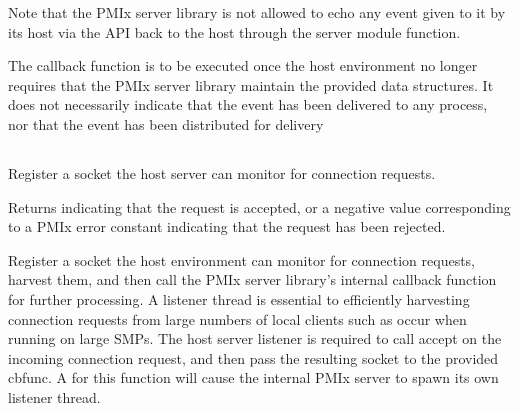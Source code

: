 Note that the \ac{PMIx} server library is not allowed to echo any event given to it by its host via the  \ac{API} back to the host through the  server module function.

\advicermstart
The callback function is to be executed once the host environment no longer requires that the \ac{PMIx} server library maintain the provided data structures. It does not necessarily indicate that the event has been delivered to any process, nor that the event has been distributed for delivery
\advicermend


\subsection{}

\summary

Register a socket the host server can monitor for connection requests.

\format


\begin{arglist}
\end{arglist}

Returns  indicating that the request is accepted, or a negative value corresponding to a PMIx error constant indicating that the request has been rejected.

\descr

Register a socket the host environment can monitor for connection requests, harvest them, and then call the \ac{PMIx} server library's internal callback function for further processing.
A listener thread is essential to efficiently harvesting connection requests from large numbers of local clients such as occur when running on large SMPs.
The host server listener is required to call accept on the incoming connection request, and then pass the resulting socket to the provided cbfunc.
A  for this function will cause the internal \ac{PMIx} server to spawn its own listener thread.

